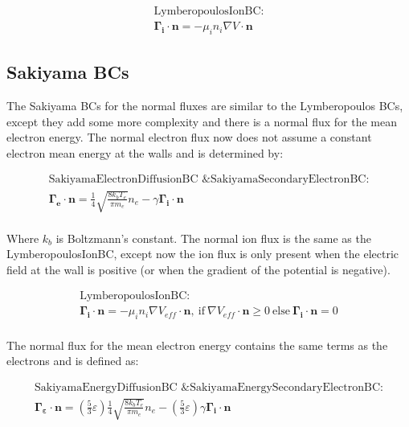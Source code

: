 \documentclass[final]{report}
\begin{document}
  \begin{equation}
  \begin{gathered}
      \text{LymberopoulosIonBC:} \\
      \mathbf{\Gamma_{i}}\cdot\mathbf{n}=-\mu_{i}n_{i}\nabla V\cdot\mathbf{n}
  \end{gathered}
  \end{equation}

  \subsection{Sakiyama BCs}

  The Sakiyama BCs for the normal fluxes are similar to the Lymberopoulos BCs, except they add some more complexity and there is a normal flux for the mean electron energy. The normal electron flux now does not assume a constant electron mean energy at the walls and is determined by:

  \begin{equation}
  \begin{gathered}
      \text{SakiyamaElectronDiffusionBC \& SakiyamaSecondaryElectronBC:} \\
      \mathbf{\Gamma_{e}}\cdot\mathbf{n}=\frac{1}{4} \sqrt{\frac{8k_{b}T_{e}}{\pi m_{e}}} n_{e}-\gamma \mathbf{\Gamma_{i}}\cdot\mathbf{n}
  \end{gathered}
  \end{equation}
  \\
  Where $k_{b}$ is Boltzmann's constant. The normal ion flux is the same as the LymberopoulosIonBC, except now the ion flux is only present when the electric field at the wall is positive (or when the gradient of the potential is negative).

  \begin{equation}
  \begin{gathered}
      \text{LymberopoulosIonBC:} \\
      \mathbf{\Gamma_{i}}\cdot\mathbf{n}=-\mu_{i}n_{i}\nabla V_{eff}\cdot\mathbf{n}, \ \text{if} \ \nabla V_{eff}\cdot\mathbf{n}\geqslant0 \ \text{else} \ \mathbf{\Gamma_{i}}\cdot\mathbf{n}=0
  \end{gathered}
  \end{equation}
  \\
  The normal flux for the mean electron energy contains the same terms as the electrons and is defined as:

  \begin{equation}
  \begin{gathered}
      \text{SakiyamaEnergyDiffusionBC \& SakiyamaEnergySecondaryElectronBC:} \\
      \mathbf{\Gamma_{\varepsilon}}\cdot\mathbf{n}=\left(\frac{5}{3}\varepsilon\right)\frac{1}{4} \sqrt{\frac{8k_{b}T_{e}}{\pi m_{e}}} n_{e}-\left(\frac{5}{3}\varepsilon\right)\gamma \mathbf{\Gamma_{i}}\cdot\mathbf{n}
  \end{gathered}
  \end{equation}
\end{document}
